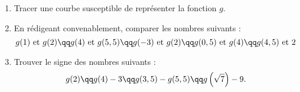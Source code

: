 \documentclass[10pt,french]{book}
\begin{document}
\begin{enumerate}
    \item Tracer une courbe susceptible de représenter la fonction $g$.
    \item En rédigeant convenablement, comparer les nombres suivants :
        \[g(1) \text{ et } g(2) \qq g(4) \text{ et } g(5,5) \qq g(-3) \text{ et } g(2) \qq g(0,5) \text{ et } g(4) \qq g(4,5) \text{ et } 2\]
    \item Trouver le signe des nombres suivants :
        \[g(2) \qq g(4) - 3 \qq g(3,5) - g(5,5) \qq g\left(\sqrt 7\right) - 9.\]
\end{enumerate}
\end{document}
